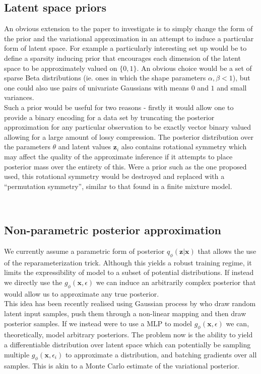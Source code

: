 \documentclass[../report.tex]{subfiles}
\begin{document}
\subsection{Latent space priors}
An obvious extension to the paper to investigate is to simply change the form of the prior and the variational approximation in an attempt to induce a particular form of latent space. For example a particularly interesting set up would be to define a sparsity inducing prior that encourages each dimension of the latent space to be approximately valued on $\{0, 1\}$. An obvious choice would be a set of sparse Beta distributions (ie. ones in which the shape parameters $\alpha, \beta < 1$), but one could also use pairs of univariate Gaussians with means $0$ and $1$ and small variances.\\

Such a prior would be useful for two reasons - firstly it would allow one to provide a binary encoding for a data set by truncating the posterior approximation for any particular observation to be exactly vector binary valued allowing for a large amount of lossy compression. The posterior distribution over the parameters $\theta$ and latent values $\mathbf{z}_i$ also contains rotational symmetry which may affect the quality of the approximate inference if it attempts to place posterior mass over the entirety of this. Were a prior such as the one proposed used, this rotational symmetry would be destroyed and replaced with a ``permutation symmetry'', similar to that found in a finite mixture model.

\\
\subsection{Non-parametric posterior approximation}
We currently assume a parametric form of posterior $q_\phi(\mathbf{z}|\mathbf{x})$ that allows the use of the reparameterization trick. Although this yields a robust training regime, it limits the expressibility of model to a subset of potential distributions. If instead we directly use the $g_\phi(\mathbf{x}, \epsilon)$ we can induce an arbitrarily complex posterior that would allow us to approximate any true posterior.\\
This idea has been recently realised using Gaussian process by \cite{tran2015variational} who draw random latent input samples, push them through a non-linear mapping and then draw posterior samples. If we instead were to use a MLP to model $g_\phi(\mathbf{x}, \epsilon)$ we can, theoretically, model arbitrary posteriors. The problem now is the ability to yield a differentiable distribution over latent space which can potentially be sampling multiple $g_\phi(\mathbf{x}, \epsilon_i)$ to approximate a distribution, and batching gradients over all samples. This is akin to a Monte Carlo estimate of the variational posterior.
\end{document}
